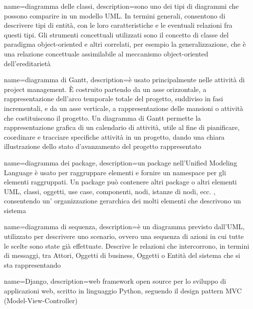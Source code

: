 {
	name=diagramma delle classi,
	description={sono uno dei tipi di diagrammi che possono comparire in un modello UML. In termini generali, consentono di descrivere tipi di entit\`{a}, con le loro caratteristiche e le eventuali relazioni fra questi tipi. Gli strumenti concettuali utilizzati sono il concetto di classe del paradigma object-oriented e altri correlati, per esempio la generalizzazione, che \`{e} una relazione concettuale assimilabile al meccanismo object-oriented dell'ereditariet\`{a}}
}

{
	name=diagramma di Gantt,
	description={è usato principalmente nelle attivit\`{a} di project management. \MakeUppercase{\`{e}} costruito partendo da un asse orizzontale, a rappresentazione dell'arco temporale totale del progetto, suddiviso in fasi incrementali, e da un asse verticale, a rappresentazione delle mansioni o attivit\`{a} che costituiscono il progetto. Un diagramma di Gantt permette la rappresentazione grafica di un calendario di attivit\`{a}, utile al fine di pianificare, coordinare e tracciare specifiche attività in un progetto, dando una chiara illustrazione dello stato d'avanzamento del progetto rappresentato}
}

{
	name=diagramma dei package,
	description={un package nell'Unified Modeling Language \`{e} usato per raggruppare elementi e fornire un namespace per gli elementi raggruppati. Un package può contenere altri package o altri elementi UML, classi, oggetti, use case, componenti, nodi, istanze di nodi, ecc. , consentendo un' organizzazione gerarchica dei molti elementi che descrivono un sistema}
}


{
	name=diagramma di sequenza,
	description={\`{e} un diagramma previsto dall'UML, utilizzato per descrivere uno scenario, ovvero una sequenza di azioni in cui tutte le scelte sono state gi\`{a} effettuate. Descrive le relazioni che intercorrono, in termini di messaggi, tra Attori, Oggetti di business, Oggetti o Entit\`{a} del sistema che si sta rappresentando
	}
}


{
	name=Django,
	description={web framework open source per lo sviluppo di applicazioni web, scritto in linguaggio Python, seguendo il design pattern MVC (Model-View-Controller)}
}

